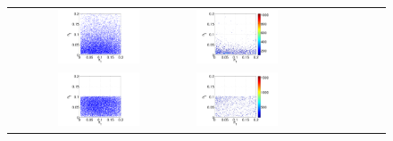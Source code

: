  \begin{figure}[ht]
        \begin{tabular}{clc}
\includegraphics[width=0.475\textwidth]{./figures/sample12.pdf} &
\includegraphics[width=0.475\textwidth]{./figures/jpdf12.pdf} \\
\includegraphics[width=0.475\textwidth]{./figures/sample13.pdf} &
\includegraphics[width=0.475\textwidth]{./figures/jpdf13.pdf} \\

\end{tabular}
\end{figure}
